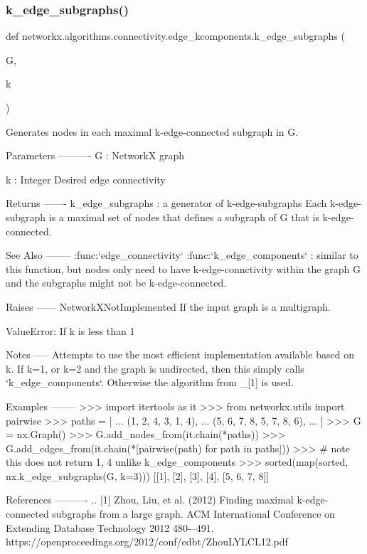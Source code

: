  \mbox{\label{namespacenetworkx_1_1algorithms_1_1connectivity_1_1edge__kcomponents_ac157f85d3e68bf00257d29488f8c795e}} 
\subsubsection{\texorpdfstring{k\+\_\+edge\+\_\+subgraphs()}{k\_edge\_subgraphs()}}
{\footnotesize\ttfamily def networkx.\+algorithms.\+connectivity.\+edge\+\_\+kcomponents.\+k\+\_\+edge\+\_\+subgraphs (\begin{DoxyParamCaption}\item[{}]{G,  }\item[{}]{k }\end{DoxyParamCaption})}

\begin{DoxyVerb}Generates nodes in each maximal k-edge-connected subgraph in G.

Parameters
----------
G : NetworkX graph

k : Integer
    Desired edge connectivity

Returns
-------
k_edge_subgraphs : a generator of k-edge-subgraphs
    Each k-edge-subgraph is a maximal set of nodes that defines a subgraph
    of G that is k-edge-connected.

See Also
--------
:func:`edge_connectivity`
:func:`k_edge_components` : similar to this function, but nodes only
    need to have k-edge-connctivity within the graph G and the subgraphs
    might not be k-edge-connected.

Raises
------
NetworkXNotImplemented
    If the input graph is a multigraph.

ValueError:
    If k is less than 1

Notes
-----
Attempts to use the most efficient implementation available based on k.
If k=1, or k=2 and the graph is undirected, then this simply calls
`k_edge_components`.  Otherwise the algorithm from _[1] is used.

Examples
--------
>>> import itertools as it
>>> from networkx.utils import pairwise
>>> paths = [
...     (1, 2, 4, 3, 1, 4),
...     (5, 6, 7, 8, 5, 7, 8, 6),
... ]
>>> G = nx.Graph()
>>> G.add_nodes_from(it.chain(*paths))
>>> G.add_edges_from(it.chain(*[pairwise(path) for path in paths]))
>>> # note this does not return {1, 4} unlike k_edge_components
>>> sorted(map(sorted, nx.k_edge_subgraphs(G, k=3)))
[[1], [2], [3], [4], [5, 6, 7, 8]]

References
----------
.. [1] Zhou, Liu, et al. (2012) Finding maximal k-edge-connected subgraphs
    from a large graph.  ACM International Conference on Extending Database
    Technology 2012 480-–491.
    https://openproceedings.org/2012/conf/edbt/ZhouLYLCL12.pdf
\end{DoxyVerb}
 